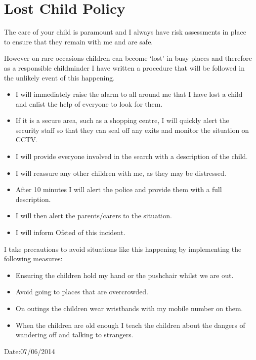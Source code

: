 

\section{Lost Child Policy}

The care of your child is paramount and I always have risk assessments
in place to ensure that they remain with me and are safe.

However on rare occasions children can become `lost' in busy places and
therefore as a responsible childminder I have written a procedure that
will be followed in the unlikely event of this happening.

\begin{itemize}
\item
  I will immediately raise the alarm to all around me that I have lost
  a child and enlist the help of everyone to look for them.
\item
  If it is a secure area, such as a shopping centre, I will quickly
  alert the security staff so that they can seal off any exits and
  monitor the situation on CCTV.
\item
  I will provide everyone involved in the search with a description of
  the child.
\item
  I will reassure any other children with me, as they may be
  distressed.
\item
  After 10 minutes I will alert the police and provide them with a
  full description.
\item
  I will then alert the parents/carers to the situation.
\item
  I will inform Ofsted of this incident.
\end{itemize}

I take precautions to avoid situations like this happening by
implementing the following measures:

\begin{itemize}
\item
  Ensuring the children hold my hand or the pushchair whilst we are
  out.
\item
  Avoid going to places that are overcrowded.
\item
  On outings the children wear wristbands with my mobile number on
  them.
\item
  When the children are old enough I teach the children about the
  dangers of wandering off and talking to strangers.
\end{itemize}

Date:07/06/2014


